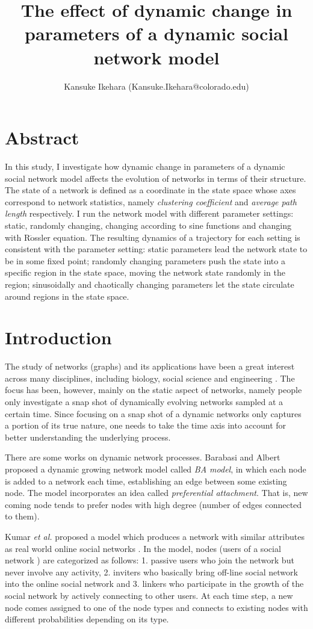 \documentclass{article}
\title{The effect of dynamic change in parameters of a dynamic social network model }
\author{Kansuke Ikehara (Kansuke.Ikehara@colorado.edu)}
\begin{document}
\maketitle
\section*{Abstract}
In this study, I investigate how dynamic change in parameters of a dynamic social network model affects the evolution of networks in terms of their structure. The state of a network is defined as a coordinate in the state space whose axes correspond to network statistics, namely \textit{clustering coefficient} and \textit{average path length} respectively. I run the network model with different parameter settings: static, randomly changing, changing according to sine functions and changing with R$\ddot{\text{o}}$ssler equation. The resulting dynamics of a trajectory for each setting is consistent with the parameter setting: static parameters lead the network state to be in some fixed point; randomly changing parameters push the state into a specific region in the state space, moving the network state randomly in the region; sinusoidally and chaotically changing parameters let the state circulate around regions in the state space.

\section{Introduction}
The study of networks (graphs) and its applications have been a great interest across many disciplines, including biology, social science and engineering \cite{Newman:2010:NI:1809753}. The focus has been, however, mainly on the static aspect of networks, namely people only investigate a snap shot of dynamically evolving networks sampled at a certain time. Since focusing on a snap shot of a dynamic networks only captures a portion of its true nature, one needs to take the time axis into account for better understanding the underlying process.

There are some works on dynamic network processes. Barabasi and Albert proposed a dynamic growing network model called \textit{BA model}, in which each node is added to a network each time, establishing an edge between some existing node\cite{BA_Model}. The model incorporates an idea called \textit{preferential attachment}. That is, new coming node tends to prefer nodes with high degree (number of edges connected to them).

Kumar \textit{et al.} proposed a model which produces a network with similar attributes as real world online social networks \cite{Kumar:2006:SEO:1150402.1150476}. In the model, nodes (users of a social network ) are categorized as follows: 1. passive users who join the network but never involve any activity, 2. inviters who basically bring off-line social network into the online social network and 3. linkers who participate in the growth of the social network by actively connecting to other users. At each time step, a new node comes assigned to one of the node types and connects to existing nodes with different probabilities depending on its type.
\end{document}
